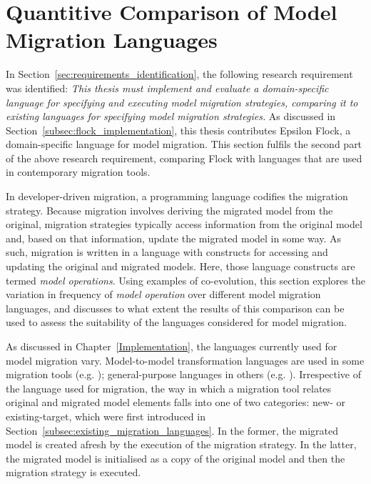 
\section{Quantitive Comparison of Model Migration Languages}
In Section~\ref{sec:requirements_identification}, the following research requirement was identified: \emph{This thesis must implement and evaluate a domain-specific language for specifying and executing model migration strategies, comparing it to existing languages for specifying model migration strategies.} As discussed in Section~\ref{subsec:flock_implementation}, this thesis contributes Epsilon Flock, a domain-specific language for model migration. This section fulfils the second part of the above research requirement, comparing Flock with languages that are used in contemporary migration tools. 

In developer-driven migration, a programming language codifies the migration strategy. Because migration involves deriving the migrated model from the original, migration strategies typically access information from the original model and, based on that information, update the migrated model in some way. As such, migration is written in a language with constructs for accessing and updating the original and migrated models. Here, those language constructs are termed \textit{model operations}. Using examples of co-evolution, this section explores the variation in frequency of \emph{model operation} over different model migration languages, and discusses to what extent the results of this comparison can be used to assess the suitability of the languages considered for model migration.

As discussed in Chapter~\ref{Implementation}, the languages currently used for model migration vary. Model-to-model transformation languages are used in some migration tools (e.g. \cite{cicchetti08automating,garces09managing}); general-purpose languages in others (e.g. \cite{herrmannsdoerfer09cope,hussey06advanced}). Irrespective of the language used for migration, the way in which a migration tool relates original and migrated model elements falls into one of two categories: new- or existing-target, which were first introduced in Section~\ref{subsec:existing_migration_languages}. In the former, the migrated model is created afresh by the execution of the migration strategy. In the latter, the migrated model is initialised as a copy of the original model and then the migration strategy is executed.

